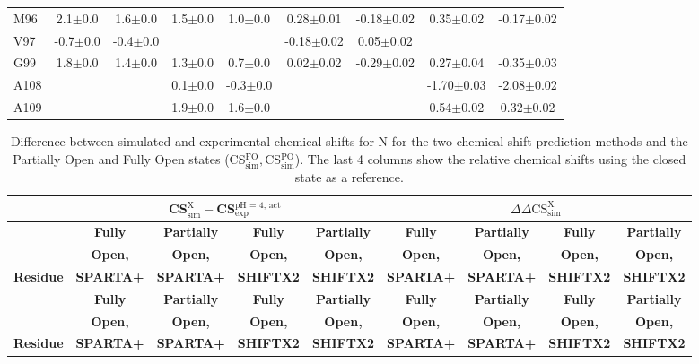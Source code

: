 \documentclass[%
 aip,
 amsmath,amssymb,
 preprint,%
]{revtex4-1}
\begin{document}
\begin{center}
\begin{longtable}{l|c|c|c|c|c|c|c|c}
M96 & 2.1$\pm$0.0 & 1.6$\pm$0.0 & 1.5$\pm$0.0 & 1.0$\pm$0.0 & 0.28$\pm$0.01 & -0.18$\pm$0.02 & 0.35$\pm$0.02 & -0.17$\pm$0.02 \\
V97 & -0.7$\pm$0.0 & -0.4$\pm$0.0 & & & -0.18$\pm$0.02 & 0.05$\pm$0.02 & & \\
G99 & 1.8$\pm$0.0 & 1.4$\pm$0.0 & 1.3$\pm$0.0 & 0.7$\pm$0.0 & 0.02$\pm$0.02 & -0.29$\pm$0.02 & 0.27$\pm$0.04 & -0.35$\pm$0.03 \\
A108 & & & 0.1$\pm$0.0 & -0.3$\pm$0.0 & & & -1.70$\pm$0.03 & -2.08$\pm$0.02 \\
A109 & & & 1.9$\pm$0.0 & 1.6$\pm$0.0 & & & 0.54$\pm$0.02 & 0.32$\pm$0.02 \\
\end{longtable}
\end{center}
\endgroup

\begingroup
\begin{center}
\begin{longtable}{l|c|c|c|c|c|c|c|c}
\caption{\scriptsize Difference between simulated and experimental chemical shifts for N for the two chemical shift prediction methods and the Partially Open and Fully Open states (CS$_\text{sim}^\text{FO}, $CS$_\text{sim}^\text{PO}$). The last 4 columns show the relative chemical shifts using the closed state as a reference.  \label{SI_tb_DDCS_N}}\\ 
\hline 
\hline 
& \multicolumn{4}{c|}{ CS$_\text{sim}^\text{X}-$CS$_\text{exp}^\text{pH = 4, act}$} & \multicolumn{4}{c}{ $\Delta\Delta\text{CS}_\text{sim}^\text{X}$} \\
\hline
& \textbf{Fully} & \textbf{Partially} & \textbf{Fully} & \textbf{Partially} & \textbf{Fully} & \textbf{Partially} & \textbf{Fully} & \textbf{Partially} \\
& \textbf{Open,} & \textbf{Open,} & \textbf{Open,} & \textbf{Open,} & \textbf{Open,} & \textbf{Open,} & \textbf{Open,} & \textbf{Open,} \\
\textbf{Residue} & \textbf{SPARTA+} & \textbf{SPARTA+} & \textbf{SHIFTX2} & \textbf{SHIFTX2} & \textbf{SPARTA+} & \textbf{SPARTA+} & \textbf{SHIFTX2} & \textbf{SHIFTX2} \\
\hline
\endfirsthead 
\hline
& \textbf{Fully} & \textbf{Partially} & \textbf{Fully} & \textbf{Partially} & \textbf{Fully} & \textbf{Partially} & \textbf{Fully} & \textbf{Partially} \\
& \textbf{Open,} & \textbf{Open,} & \textbf{Open,} & \textbf{Open,} & \textbf{Open,} & \textbf{Open,} & \textbf{Open,} & \textbf{Open,} \\
\textbf{Residue} & \textbf{SPARTA+} & \textbf{SPARTA+} & \textbf{SHIFTX2} & \textbf{SHIFTX2} & \textbf{SPARTA+} & \textbf{SPARTA+} & \textbf{SHIFTX2} & \textbf{SHIFTX2} \\ \hline

\end{longtable}
\end{center}
\end{document}
